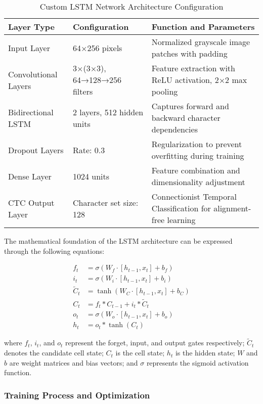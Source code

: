 \begin{table}[H]
\centering
\caption{Custom LSTM Network Architecture Configuration}
\label{tab:lstm_architecture}
\begin{tabular}{|l|l|p{7cm}|}
\hline
\textbf{Layer Type} & \textbf{Configuration} & \textbf{Function and Parameters} \\
\hline
Input Layer & 64×256 pixels & Normalized grayscale image patches with padding \\
\hline
Convolutional Layers & 3×(3×3), 64→128→256 filters & Feature extraction with ReLU activation, 2×2 max pooling \\
\hline
Bidirectional LSTM & 2 layers, 512 hidden units & Captures forward and backward character dependencies \\
\hline
Dropout Layers & Rate: 0.3 & Regularization to prevent overfitting during training \\
\hline
Dense Layer & 1024 units & Feature combination and dimensionality adjustment \\
\hline
CTC Output Layer & Character set size: 128 & Connectionist Temporal Classification for alignment-free learning \\
\hline
\end{tabular}
\end{table}

The mathematical foundation of the LSTM architecture can be expressed through the following equations:

\begin{align}
    f_t &= \sigma(W_f \cdot [h_{t-1}, x_t] + b_f) \\
    i_t &= \sigma(W_i \cdot [h_{t-1}, x_t] + b_i) \\
    \tilde{C}_t &= \tanh(W_C \cdot [h_{t-1}, x_t] + b_C) \\
    C_t &= f_t * C_{t-1} + i_t * \tilde{C}_t \\
    o_t &= \sigma(W_o \cdot [h_{t-1}, x_t] + b_o) \\
    h_t &= o_t * \tanh(C_t)
\end{align}

where $f_t$, $i_t$, and $o_t$ represent the forget, input, and output gates respectively; $\tilde{C}_t$ denotes the candidate cell state; $C_t$ is the cell state; $h_t$ is the hidden state; $W$ and $b$ are weight matrices and bias vectors; and $\sigma$ represents the sigmoid activation function.

\subsubsection{Training Process and Optimization}

